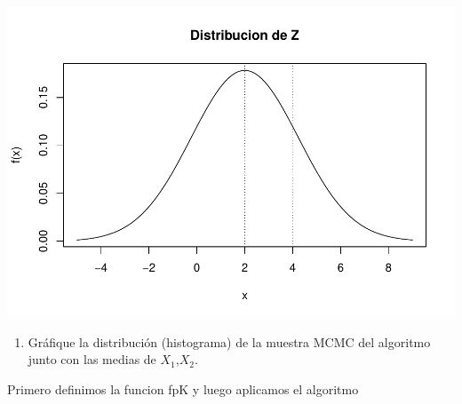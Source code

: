 \documentclass[
]{article}
\providecommand{\tightlist}{%
  \setlength{\itemsep}{0pt}\setlength{\parskip}{0pt}}
\begin{document}
\includegraphics{tarea2_files/figure-latex/unnamed-chunk-12-1.pdf}

\begin{enumerate}
\def\labelenumi{\alph{enumi}.}
\setcounter{enumi}{1}
\tightlist
\item
  Gráfique la distribución (histograma) de la muestra MCMC del algoritmo
  junto con las medias de \(𝑋_1\),\(𝑋_2\).
\end{enumerate}

Primero definimos la funcion fpK y luego aplicamos el algoritmo
\end{document}
